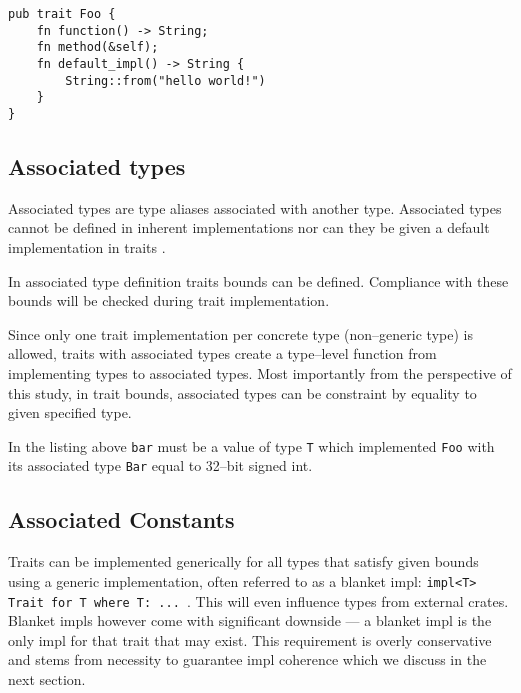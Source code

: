 \begin{lstlisting}
pub trait Foo {
    fn function() -> String;
    fn method(&self);
    fn default_impl() -> String {
        String::from("hello world!")
    }
}

\end{lstlisting}

\subsection{Associated types}

Associated types are type aliases associated with another type. Associated types cannot be defined in inherent implementations nor can they be given a default implementation in traits \cite{rustreference}.



In associated type definition traits bounds can be defined. Compliance with these bounds will be checked during trait implementation.



Since only one trait implementation per concrete type (non--generic type) is allowed, traits with associated types create a type--level function from implementing types to associated types.
Most importantly from the perspective of this study, in trait bounds, associated types can be constraint by equality to given specified type.
\label{sec:assoctypes}



In the listing above \texttt{bar} must be a value of type \texttt{T} which implemented \texttt{Foo} with its associated type \texttt{Bar} equal to 32--bit signed int.

\subsection{Associated Constants}

Traits can be implemented generically for all types that satisfy given bounds using a generic implementation, often referred to as a blanket impl:
\texttt{impl<T> Trait for T where T: ... }.
This will even influence types from external crates. Blanket impls however come with significant downside --- a blanket impl is the only impl for that trait that may exist.
This requirement is overly conservative and stems from necessity to guarantee impl coherence which we discuss in the next section.

